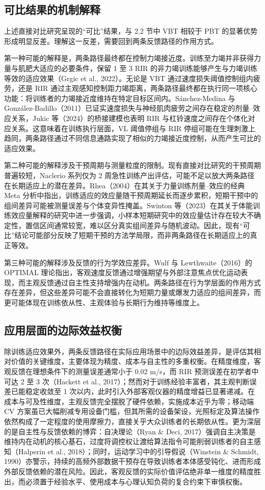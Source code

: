 \documentclass[UTF8,zihao=-4,twoside,openany]{ctexbook}
\begin{document}
\subsection{可比结果的机制解释}
上述直接对比研究呈现的“可比”结果，与 2.2 节中 VBT 相较于 PBT 的显著优势形成明显反差。理解这一反差，需要回到两条反馈路径的作用方式。

第一种可能的解释是，两条路径最终都在控制力竭接近度。训练至力竭并非获得力量与肌肥大适应的必要条件，保留 1 至 3 RIR 的非力竭训练能够产生与力竭训练等效的适应效果（Grgic et al., 2022）。无论是 VBT 通过速度损失阈值控制组内疲劳，还是 RIR 通过主观感知控制距力竭距离，两条路径最终都在执行同一项核心功能：将训练者的力竭接近度维持在特定目标区间内。Sánchez-Medina 与 González-Badillo（2011）已证实速度损失与神经肌肉疲劳之间存在稳定的剂量--效应关系，Jukic 等（2024）的桥接建模也表明 RIR 与杠铃速度之间存在个体化对应关系。这意味着在训练执行层面，VL 阈值停组与 RIR 停组可能在生理刺激上趋同，两条路径通过不同信息通路实现了相似的力竭接近度控制，从而产生可比的适应效果。

第二种可能的解释涉及干预周期与测量粒度的限制。现有直接对比研究的干预周期普遍较短，Naclerio 系列仅为 2 周急性训练产出评估，可能不足以放大两条路径在长期适应上的潜在差异。Rhea（2004）在其关于力量训练剂量--效应的经典 Meta 分析中指出，训练适应的效应量随干预周期延长而逐步累积，短期干预中的组间差异可能被测量误差与个体变异性掩盖。Swinton 等（2023）在其关于体能训练效应量解释的研究中进一步强调，小样本短期研究中的效应量估计存在较大不确定性，置信区间通常较宽，难以区分真实组间差异与随机波动。因此，现有“可比”结论可能部分反映了短期干预的方法学局限，而非两条路径在长期适应上的真正等效。

第三种可能的解释涉及反馈的行为学效应差异。Wulf 与 Lewthwaite（2016）的 OPTIMAL 理论指出，客观速度反馈通过增强期望与外部注意焦点优化运动表现，而主观反馈通过自主性支持增强内在动机。两条路径在行为学层面的作用方式存在差异，但这些差异可能不会直接转化为短期力量或爆发力适应的组间差异，而更可能体现在训练依从性、主观体验与长期行为维持等维度上。

\subsection{应用层面的边际效益权衡}
除训练适应效果外，两条反馈路径在实际应用场景中的边际效益差异，是评估其相对价值的关键维度，主要体现为精度、成本与自主性的多重权衡。在精度维度，客观反馈在理想条件下的测量误差通常小于 0.02 m/s，而 RIR 预测误差在初学者中可达 2 至 3 次（Hackett et al., 2017）；然而对于训练经验丰富者，其主观判断误差已能稳定收敛至 1 次以内，此时引入外部客观仪器的精度增益已显著递减。在成本与可及性维度，主观反馈完全摆脱了硬件依赖，实施成本近乎为零；移动端 CV 方案虽已大幅削减专用设备门槛，但其所需的设备架设，光照标定及算法操作依然构成了一定程度的使用摩擦力，直接关乎大众训练者的长期依从性。更为深层的是自主性与反馈依赖的博弈：自决理论（Ryan \& Deci, 2017）强调自主决策是维持内在动机的核心基石，过度将调控权让渡给算法指令可能削弱训练者的自主感知（Halperin et al., 2018）；同时，运动学习中的引导假说（Winstein \& Schmidt, 1990）亦警示，持续的高频外部数据干预存在导致训练者本体感受钝化、进而形成外部反馈依赖的潜在风险。因此，客观反馈的实际价值评估绝非单一维度的精度胜出，而必须置于经验水平、使用成本与心理认知负荷的复合约束下审慎权衡。
\end{document}
